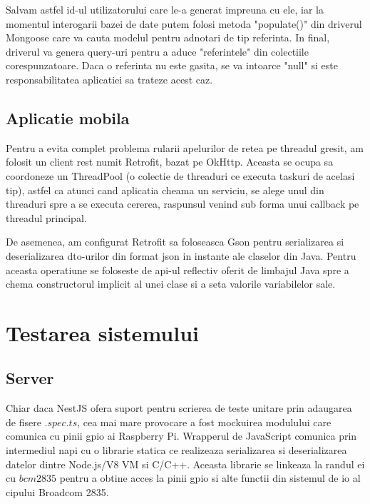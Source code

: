 Salvam astfel id-ul utilizatorului care le-a generat impreuna cu ele, iar la momentul interogarii bazei de date putem folosi metoda "populate()" din driverul Mongoose care va cauta modelul pentru adnotari de tip referinta. In final, driverul va genera query-uri pentru a aduce "referintele" din colectiile corespunzatoare. Daca o referinta nu este gasita, se va intoarce "null" si este responsabilitatea aplicatiei sa trateze acest caz. 

\subsection {Aplicatie mobila}

Pentru a evita complet problema rularii apelurilor de retea pe threadul gresit, am folosit un client \acrshort{rest} numit Retrofit, bazat pe OkHttp. Aceasta se ocupa sa coordoneze un ThreadPool (o colectie de threaduri ce executa taskuri de acelasi tip), astfel ca atunci cand aplicatia cheama un serviciu, se alege unul din threaduri spre a se executa cererea, raspunsul venind sub forma unui callback pe threadul principal.

De asemenea, am configurat Retrofit sa foloseasca Gson pentru serializarea si deserializarea \acrshort{dto}-urilor din format \acrshort{json} in instante ale claselor din Java. Pentru aceasta operatiune se foloseste de \acrshort{api}-ul reflectiv oferit de limbajul Java spre a chema constructorul implicit al unei clase si a seta valorile variabilelor sale.

\section {Testarea sistemului}

\subsection {Server}

Chiar daca NestJS ofera suport pentru scrierea de teste unitare prin adaugarea de fisere $.spec.ts$, cea mai mare provocare a fost mockuirea modulului care comunica cu pinii \acrshort{gpio} ai Raspberry Pi. Wrapperul de JavaScript comunica prin intermediul \acrfull{napi} cu o librarie statica ce realizeaza serializarea si deserializarea datelor dintre Node.js/V8 VM si C/C++. Aceasta librarie se linkeaza la randul ei cu $bcm2835$ pentru a obtine acces la pinii \acrshort{gpio} si alte functii din sistemul de \acrfull{io} al cipului Broadcom 2835.

